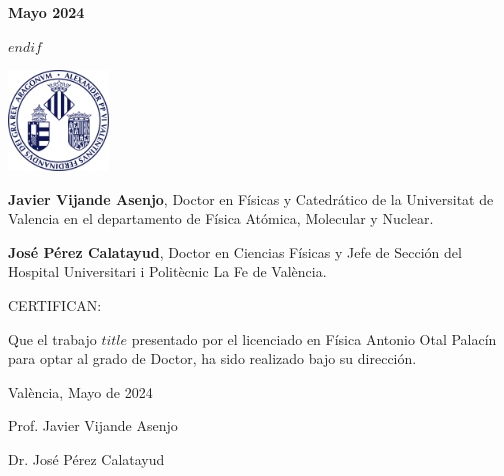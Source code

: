 \vfill %

{\bfseries\large Mayo 2024 \par}
\raggedright
$endif$


\newpage
\thispagestyle{empty}
\begin{flushright}
\end{flushright}


\includegraphics[width=0.2\textwidth]{logouni} %

\vspace{4ex}

\textbf{Javier Vijande Asenjo}, Doctor en Físicas y Catedrático de la Universitat de Valencia en el departamento de Física Atómica, Molecular y Nuclear.

\vspace{3ex}

\textbf{José Pérez Calatayud}, Doctor en Ciencias Físicas y Jefe de Sección del Hospital Universitari i Politècnic La Fe de València.

\vspace{3ex}

{\Large CERTIFICAN: }

\vspace{3ex}

Que el trabajo \textbf{$title$} presentado por el licenciado 
en Física Antonio Otal Palacín para optar al grado de Doctor, ha
sido realizado bajo su dirección.

\vspace{3ex}

València, Mayo de 2024

\vspace{25ex}

\begin{minipage}[t]{0.4\textwidth}
    \centering
    {\large Prof. Javier Vijande Asenjo \par}
\end{minipage}
\hfill
\begin{minipage}[t]{0.4\textwidth}
    \centering
    {\large Dr. José Pérez Calatayud \par}
\end{minipage}
\raggedright



